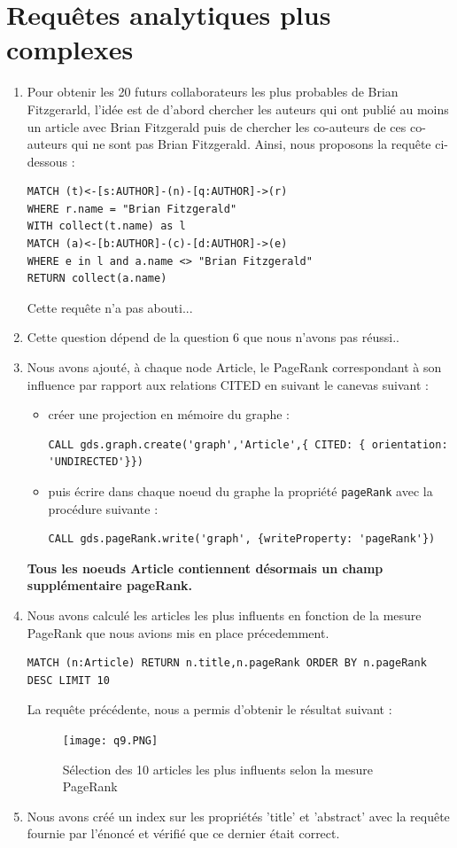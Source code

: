 \documentclass[11pt]{article}
\begin{document}
\section{Requêtes analytiques plus complexes}
\begin{enumerate}[resume]
\item 
Pour obtenir les 20 futurs collaborateurs les plus probables de Brian Fitzgerarld, l'idée est de d'abord chercher les auteurs qui ont publié au moins un article avec Brian Fitzgerald puis de chercher les co-auteurs de ces co-auteurs qui ne sont pas Brian Fitzgerald. Ainsi, nous proposons la requête ci-dessous :
\begin{lstlisting}
MATCH (t)<-[s:AUTHOR]-(n)-[q:AUTHOR]->(r) 
WHERE r.name = "Brian Fitzgerald" 
WITH collect(t.name) as l 
MATCH (a)<-[b:AUTHOR]-(c)-[d:AUTHOR]->(e) 
WHERE e in l and a.name <> "Brian Fitzgerald" 
RETURN collect(a.name)
\end{lstlisting}
Cette requête n'a pas abouti...
\item
Cette question dépend de la question 6 que nous n'avons pas réussi..
\item 
Nous avons ajouté, à chaque node Article, le PageRank correspondant à son influence par rapport aux relations CITED en suivant le canevas suivant :
\begin{itemize}
    \item créer une projection en mémoire du graphe :
    \begin{lstlisting}
CALL gds.graph.create('graph','Article',{ CITED: { orientation: 'UNDIRECTED'}})
    \end{lstlisting}
    \item puis écrire dans chaque noeud du graphe la propriété \texttt{pageRank} avec la procédure suivante :
    \begin{lstlisting}
CALL gds.pageRank.write('graph', {writeProperty: 'pageRank'})
    \end{lstlisting}
\end{itemize}
\textbf{Tous les noeuds Article contiennent désormais un champ supplémentaire pageRank.}
\item 
Nous avons calculé les articles les plus influents en fonction de la mesure PageRank que nous avions mis en place précedemment.
\begin{lstlisting}
MATCH (n:Article) RETURN n.title,n.pageRank ORDER BY n.pageRank DESC LIMIT 10
\end{lstlisting}
La requête précédente, nous a permis d'obtenir le résultat suivant :
\begin{figure}[H]
    \centerline{\texttt{[image: q9.PNG]}}
    \caption{Sélection des 10 articles les plus influents selon la mesure PageRank}
\end{figure}
\item 
Nous avons créé un index sur les propriétés 'title' et 'abstract' avec la requête fournie par l'énoncé et vérifié que ce dernier était correct.


\end{enumerate}
\end{document}
